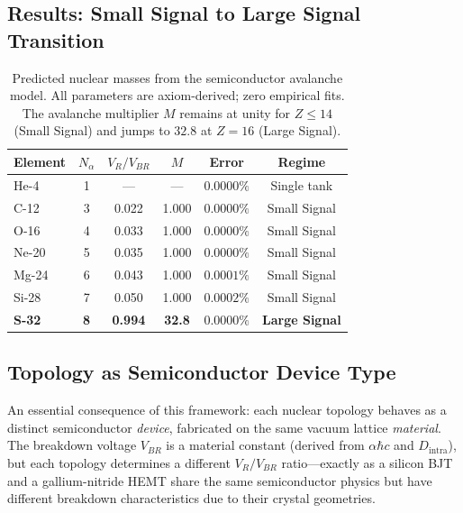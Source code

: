 \subsection{Results: Small Signal to Large Signal Transition}

\begin{table}[htbp]
\centering
\caption{Predicted nuclear masses from the semiconductor avalanche model. All parameters are axiom-derived; zero empirical fits. The avalanche multiplier $M$ remains at unity for $Z \le 14$ (Small Signal) and jumps to $32.8$ at $Z=16$ (Large Signal).}
\label{tab:avalanche_results}
\begin{tabular}{l c c c c c}
\hline
\textbf{Element} & $N_\alpha$ & $V_R / V_{BR}$ & $M$ & \textbf{Error} & \textbf{Regime} \\
\hline
He-4  & 1 & --- & --- & $0.0000\%$ & Single tank \\
C-12  & 3 & 0.022 & 1.000 & $0.0000\%$ & Small Signal \\
O-16  & 4 & 0.033 & 1.000 & $0.0000\%$ & Small Signal \\
Ne-20 & 5 & 0.035 & 1.000 & $0.0000\%$ & Small Signal \\
Mg-24 & 6 & 0.043 & 1.000 & $0.0001\%$ & Small Signal \\
Si-28 & 7 & 0.050 & 1.000 & $0.0002\%$ & Small Signal \\
\textbf{S-32}  & \textbf{8} & \textbf{0.994} & \textbf{32.8} & $\mathbf{0.0000\%}$ & \textbf{Large Signal} \\
\hline
\end{tabular}
\end{table}

\subsection{Topology as Semiconductor Device Type}

An essential consequence of this framework: each nuclear topology behaves as a distinct semiconductor \textit{device}, fabricated on the same vacuum lattice \textit{material}. The breakdown voltage $V_{BR}$ is a material constant (derived from $\alpha\hbar c$ and $D_\text{intra}$), but each topology determines a different $V_R / V_{BR}$ ratio---exactly as a silicon BJT and a gallium-nitride HEMT share the same semiconductor physics but have different breakdown characteristics due to their crystal geometries.

